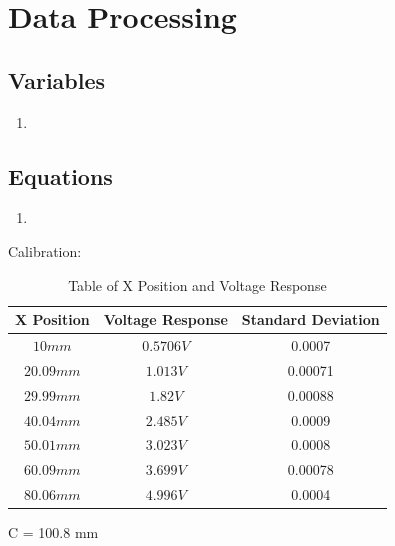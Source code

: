 \documentclass{article}
\begin{document}
\section{Data Processing}
\subsection*{Variables}
\begin{enumerate}[label = \roman*.]
    \item
\end{enumerate}

\subsection*{Equations}
\begin{enumerate}[label = \Roman*.]
    \item 
\end{enumerate} 

Calibration:
\begin{table}[ht]
\centering
\begin{tabular}{|c|c|c|}
\hline
\textbf{X Position} & \textbf{Voltage Response} & \textbf{Standard Deviation} \\
\hline
$10 mm$ & $0.5706 V$ & 0.0007\\
\hline
$20.09 mm$ & $1.013 V$ & 0.00071 \\
\hline
$29.99 mm$ & $1.82 V$ & 0.00088 \\
\hline
$40.04 mm$ & $2.485 V$ & 0.0009\\
\hline
$50.01 mm$ & $3.023 V$ & 0.0008\\
\hline
$60.09 mm$ & $3.699 V$ & 0.00078\\
\hline
$80.06 mm$ & $4.996 V$ & 0.0004\\
\hline
\end{tabular}
\caption{Table of X Position and Voltage Response}
\label{tab:position_voltage}
\end{table}

C = 100.8 mm
\end{document}

